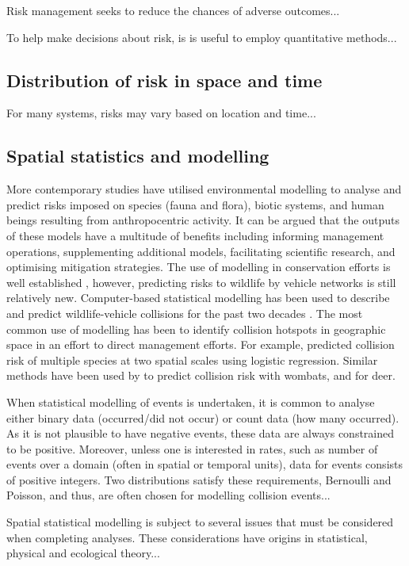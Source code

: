 Risk management seeks to reduce the chances of adverse outcomes...

To help make decisions about risk, is is useful to employ quantitative methods...

\subsection{Distribution of risk in space and time}

For many systems, risks may vary based on location and time...

\subsection{Spatial statistics and modelling}

More contemporary studies have utilised environmental modelling to analyse and predict risks imposed on species (fauna and flora), biotic systems, and human beings resulting from anthropocentric activity. It can be argued that the outputs of these models have a multitude of benefits including informing management operations, supplementing additional models, facilitating scientific research, and optimising mitigation strategies.  The use of modelling in conservation efforts is well established \citep{star86}, however, predicting risks to wildlife by vehicle networks is still relatively new.   Computer-based statistical modelling has been used to describe and predict wildlife-vehicle collisions for the past two decades \citep{guns11}.  The most common use of modelling has been to identify collision hotspots in geographic space in an effort to direct management efforts.  For example, \cite{malo04} predicted collision risk of multiple species at two spatial scales using logistic regression.  Similar methods have been used by \cite{roge09} to predict collision risk with wombats, and \cite{sudh09} for deer.

When statistical modelling of events is undertaken, it is common to analyse either binary data (occurred/did not occur) or count data (how many occurred).  As it is not plausible to have negative events, these data are always constrained to be positive.  Moreover, unless one is interested in rates, such as number of events over a domain (often in spatial or temporal units), data for events consists of positive integers.  Two distributions satisfy these requirements, Bernoulli and Poisson, and thus, are often chosen for modelling collision events...

Spatial statistical modelling is subject to several issues that must be considered when completing analyses.  These considerations have origins in statistical, physical and ecological theory...

